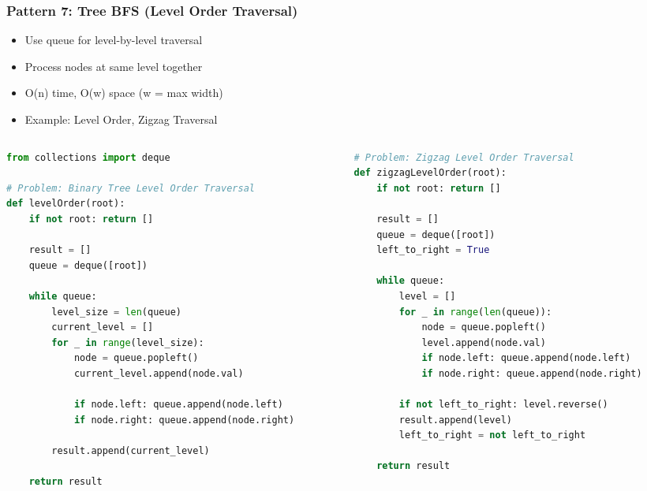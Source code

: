 \begin{frame}[fragile]\frametitle{Pattern 7: Tree BFS (Level Order Traversal)}
      \begin{itemize}
        \item Use queue for level-by-level traversal
        \item Process nodes at same level together
        \item O(n) time, O(w) space (w = max width)
        \item Example: Level Order, Zigzag Traversal
      \end{itemize}
\begin{columns}
    \begin{column}[T]{0.5\linewidth}
      \begin{lstlisting}[language=python, basicstyle=\tiny]
from collections import deque

# Problem: Binary Tree Level Order Traversal
def levelOrder(root):
    if not root: return []
    
    result = []
    queue = deque([root])
    
    while queue:
        level_size = len(queue)
        current_level = []
        for _ in range(level_size):
            node = queue.popleft()
            current_level.append(node.val)
            
            if node.left: queue.append(node.left)
            if node.right: queue.append(node.right)
        
        result.append(current_level)
    
    return result
      \end{lstlisting}
    \end{column}
    \begin{column}[T]{0.5\linewidth}
      \begin{lstlisting}[language=python, basicstyle=\tiny]
# Problem: Zigzag Level Order Traversal
def zigzagLevelOrder(root):
    if not root: return []
    
    result = []
    queue = deque([root])
    left_to_right = True
    
    while queue:
        level = []
        for _ in range(len(queue)):
            node = queue.popleft()
            level.append(node.val)
            if node.left: queue.append(node.left)
            if node.right: queue.append(node.right)
        
        if not left_to_right: level.reverse()
        result.append(level)
        left_to_right = not left_to_right
    
    return result
      \end{lstlisting}

    \end{column}
  \end{columns}
\end{frame}

